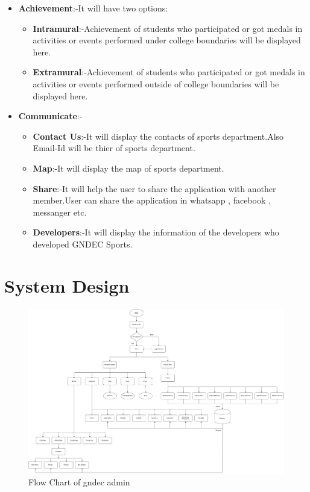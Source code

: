 \begin{itemize}
\begin{itemize}
			\item \textbf{Achievement}:-It will have two options:
			\begin{itemize} 
			\item \textbf{Intramural}:-Achievement of students who participated or got medals in activities or events performed under college boundaries will be displayed here.
			\item \textbf{Extramural}:-Achievement of students who participated or got medals in activities or events performed outside of college boundaries will be displayed here.
			\end{itemize}
			\item \textbf{Communicate}:-
			\begin{itemize} 
			\item \textbf{Contact Us}:-It will display the contacts of sports department.Also Email-Id will be thier of sports department. 
			\item \textbf{Map}:-It will display the map of sports department.
\item \textbf{Share}:-It will help the user to share the application with another member.User can share the application in whatsapp , facebook , messanger etc.
\item \textbf{Developers}:-It will display the information of the developers who developed GNDEC Sports.  			
			
			\end{itemize}
			
		\end{itemize}
	\end{itemize}

\section{System Design}

\newpage
\begin{figure}[ht]
	
	\includegraphics[scale=0.25]{images/Gndecadmingne.png}
	\caption{Flow Chart of gndec admin}
\end{figure}

